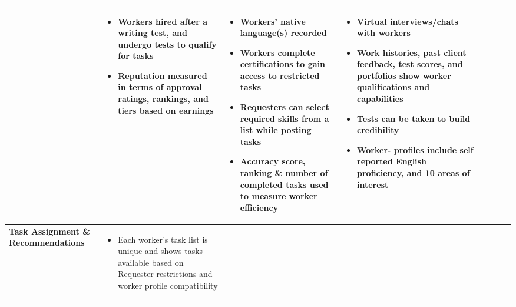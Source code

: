 \documentclass{sigchi}
\begin{document}
\begin{sidewaystable*}
\begin{tabular}[h]{| p{1.5cm}| p{2.7cm}| p{2.7cm}| p{2.7cm}| p{2.7cm}| p{2.7cm}| p{2.7cm}| p{2.7cm}|}
{} &
{
\begin{itemize} [noitemsep,nolistsep]
\item  Workers hired after a writing test, and undergo tests to qualify for tasks
\item  Reputation measured in terms of approval ratings, rankings, and tiers based on earnings
\end{itemize}
} &
{
\begin{itemize} [noitemsep,nolistsep]
\item  Workers' native language(s) recorded
\item  Workers complete certifications to gain access to restricted tasks
\item  Requesters can select required skills from a list while posting tasks
\item  Accuracy score, ranking \& number of completed tasks used to measure worker efficiency
\end{itemize}
} &
{
\begin{itemize} [noitemsep,nolistsep]
\item  Virtual interviews/chats with workers
\item  Work histories, past client feedback, test scores, and portfolios show worker qualifications and capabilities
\item  Tests can be taken to build credibility
\item  Worker- profiles include self reported English proficiency, and 10 areas of interest
\end{itemize}
} \\ 
\hline


 

{\bf Task Assignment \& Recommendations
} & 
{
\begin{itemize} [noitemsep,nolistsep]
\item  Each worker's task list is unique and shows tasks available based on Requester restrictions and worker profile compatibility
\end{itemize}
} &
{

}
\end{tabular}
\end{sidewaystable*}
\end{document}
